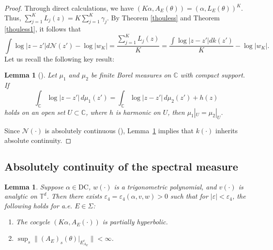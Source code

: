 \documentclass[11pt]{amsart}
\newtheorem{lemma}[theorem]{Lemma}
\theoremstyle{remark}
\theoremstyle{definition}
\begin{document}
\begin{proof}
Through direct calculations, we have $(K\alpha, A_E(\theta)) = (\alpha, L_E(\theta))^K$. Thus, $\sum_{j=1}^{K} L_j(z) = K \sum_{j=1}^{K} \gamma_j$. By Theorem \ref{thouless} and Theorem \ref{thouless1}, it follows that     
	$$\int\log|z-z'|d\mathcal{N}(z')-\log|w_K|=\frac{\sum_{j=1}^{K}L_j(z)}{K}=\frac{\int\log|z-z'|dk(z')}{K}-\log|w_K|.$$
	Let us recall the following key result:

\begin{lemma}[{\cite[Theorem 3.2.3]{ransford}}]\label{ran}
    Let $\mu_1$ and $\mu_2$ be finite Borel measures on $\mathbb{C}$ with compact support. If 
    \[
    \int_{\mathbb{C}} \log|z - z'| \, d\mu_1(z') = \int_{\mathbb{C}} \log|z - z'| \, d\mu_2(z') + h(z)
    \]
    holds on an open set $U \subset \mathbb{C}$, where $h$ is harmonic on $U$, then $\mu_1|_U = \mu_2|_U$.
\end{lemma}

Since $\mathcal{N}(\cdot)$ is absolutely continuous (\cite[Theorem 1.2]{WXYZ}), Lemma~\ref{ran} implies that $k(\cdot)$ inherits absolute continuity.
\end{proof}



\subsection{Absolutely continuity of the spectral measure} 



\begin{lemma}\label{iml}
    Suppose $\alpha \in \mathrm{DC}$, $w(\cdot)$ is a trigonometric polynomial, and $v(\cdot)$ is analytic on $\mathbb{T}^d$. Then there exists $\varepsilon_4 = \varepsilon_4(\alpha, v, w) > 0$ such that for $|\varepsilon| < \varepsilon_4$, the following holds for a.e. $E \in \Sigma$:
    \begin{enumerate}
        \item The cocycle $(K\alpha, A_E(\cdot))$ is partially hyperbolic.
        \item $\sup_s \|(A_E)_s(\theta)|_{E_{A_E}^c}\| < \infty$.
    \end{enumerate}
\end{lemma}
\end{document}
